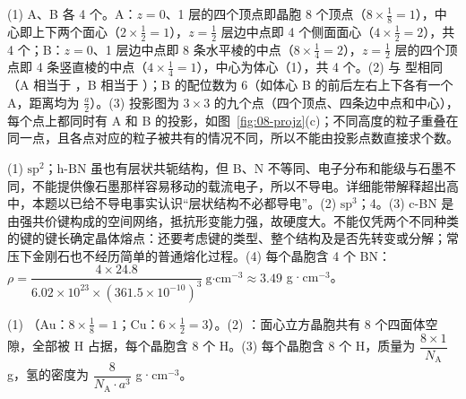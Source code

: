 \begin{jiexilist}
\item (1) A、B 各 4 个。A：$z=0$、1 层的四个顶点即晶胞 8 个顶点（$8\times\frac18=1$），中心即上下两个面心（$2\times\frac12=1$），$z=\frac12$ 层边中点即 4 个侧面面心（$4\times\frac12=2$），共 4 个；B：$z=0$、1 层边中点即 8 条水平棱的中点（$8\times\frac14=2$），$z=\frac12$ 层的四个顶点即 4 条竖直棱的中点（$4\times\frac14=1$），中心为体心（1），共 4 个。(2) 与  型相同（A 相当于 ，B 相当于 ）；B 的配位数为 6（如体心 B 的前后左右上下各有一个 A，距离均为 $\frac a2$）。(3) 投影图为 $3\times3$ 的九个点（四个顶点、四条边中点和中心），每个点上都同时有 A 和 B 的投影，如图~\ref{fig:08-projz}(c)；不同高度的粒子重叠在同一点，且各点对应的粒子被共有的情况不同，所以不能由投影点数直接求个数。
\item (1) $\mathrm{sp}^2$；h-BN 虽也有层状共轭结构，但 B、N 不等同、电子分布和能级与石墨不同，不能提供像石墨那样容易移动的载流电子，所以不导电。详细能带解释超出高中，本题以已给不导电事实认识“层状结构不必都导电”。(2) $\mathrm{sp}^3$；4。(3) c-BN 是由强共价键构成的空间网络，抵抗形变能力强，故硬度大。不能仅凭两个不同种类的键的键长确定晶体熔点：还要考虑键的类型、整个结构及是否先转变或分解；常压下金刚石也不经历简单的普通熔化过程。(4) 每个晶胞含 4 个 BN：$\rho=\dfrac{4\times24.8}{6.02\times10^{23}\times(361.5\times10^{-10})^3}\ \text{g·cm}^{-3}\approx3.49$ g·cm$^{-3}$。
\item (1) （Au：$8\times\frac18=1$；Cu：$6\times\frac12=3$）。(2) ：面心立方晶胞共有 8 个四面体空隙，全部被 H 占据，每个晶胞含 8 个 H。(3) 每个晶胞含 8 个 H，质量为 $\dfrac{8\times1}{N_\text{A}}$ g，氢的密度为 $\dfrac{8}{N_\text{A}\cdot a^3}$ g·cm$^{-3}$。
\end{jiexilist}
